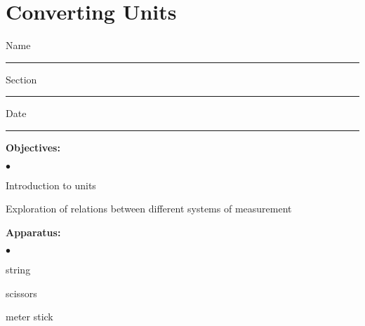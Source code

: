 
\section{Converting Units}

Name \rule{2.0in}{0.1pt}\hfill{}Section \rule{1.0in}{0.1pt}\hfill{}Date \rule{1.0in}{0.1pt}

{\noindent \bf Objectives:} \begin{list}{$\bullet$}{\itemsep0pt }

\item Introduction to units \item Exploration of relations between different systems of measurement

\end{list}

{\noindent \bf Apparatus:} \begin{list}{$\bullet$}{\itemsep0pt }

\item string \item scissors \item meter stick

\end{list}


